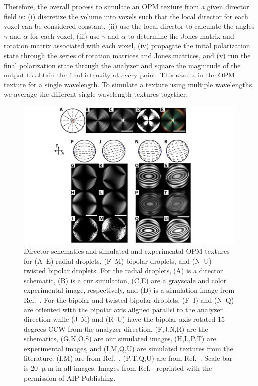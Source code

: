 Therefore, the overall process to simulate an OPM texture from a given director field is: (i) discretize the volume into voxels such that the local director for each voxel can be considered constant, (ii) use the local director to calculate the angles $\gamma$ and $\alpha$ for each voxel, (iii) use $\gamma$ and $\alpha$ to determine the Jones matrix and rotation matrix associated with each voxel, (iv) propagate the inital polarization state through the series of rotation matrices and Jones matrices, and (v) run the final polarization state through the analyzer and square the magnitude of the output to obtain the final intensity at every point.
This results in the OPM texture for a single wavelength.
To simulate a texture using multiple wavelengths, we average the different single-wavelength textures together.
\begin{figure}
\centering
\includegraphics{figures/C4/Ch4-Figs_JonesSphere.png}
\caption{Director schematics and simulated and experimental OPM textures for (A--E) radial droplets, (F--M) bipolar droplets, and (N--U) twisted bipolar droplets.
For the radial droplets, (A) is a director schematic, (B) is a our simulation, (C,E) are a grayscale and color experimental image, respectively, and (D) is a simulation image from Ref.~\cite{RN310}.
For the bipolar and twisted bipolar droplets, (F--I) and (N--Q) are oriented with the bipolar axis aligned parallel to the analyzer direction while (J--M) and (R--U) have the bipolar axis rotated 15 degrees CCW from the analyzer direction. (F,J,N,R) are the schematics, (G,K,O,S) are our simulated images, (H,L,P,T) are experimental images, and (I,M,Q,U) are simulated textures from the literature.
(I,M) are from Ref.~\cite{RN310}, (P,T,Q,U) are from Ref.~\cite{RN193}.
Scale bar is 20 $\upmu$m in all images.
Images from Ref.~\cite{RN310} reprinted with the permission of AIP Publishing.
}\label{f:4-spherecomparison}
\end{figure}

